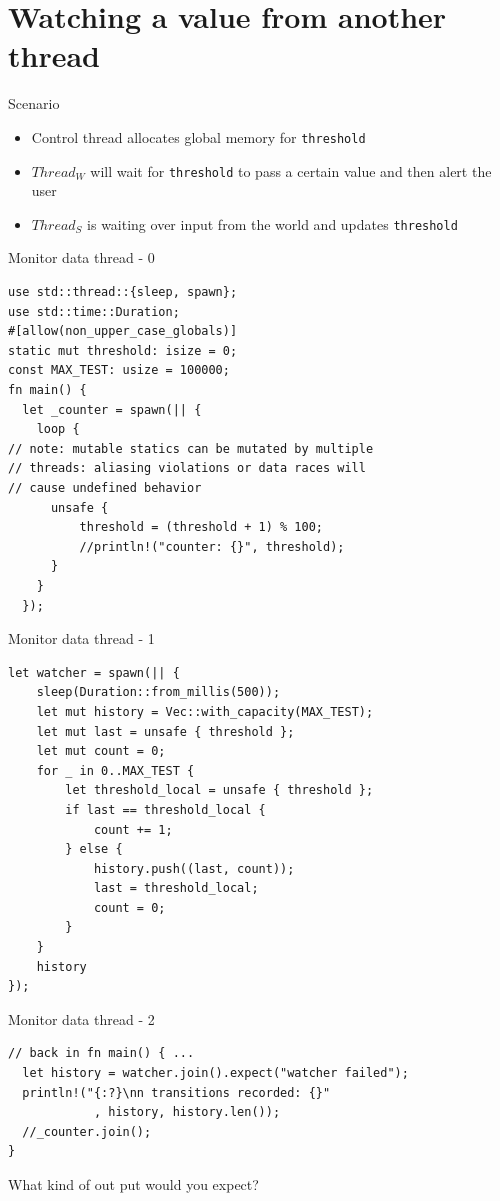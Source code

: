 \documentclass[10pt]{beamer}
\begin{document}
\section{Watching a value from another thread}

\begin{frame}{Scenario}
    \begin{itemize}
        \item Control thread allocates global memory for \texttt{threshold}
        \item $Thread_W$ will wait for \texttt{threshold} to pass a certain value and then alert the user
        \item $Thread_S$ is waiting over input from the world and updates \texttt{threshold}
    \end{itemize}
\end{frame}

\begin{frame}[fragile]{Monitor data thread - 0}
\begin{verbatim}
use std::thread::{sleep, spawn};
use std::time::Duration;
#[allow(non_upper_case_globals)]
static mut threshold: isize = 0;
const MAX_TEST: usize = 100000;
fn main() {
  let _counter = spawn(|| {
    loop {
// note: mutable statics can be mutated by multiple 
// threads: aliasing violations or data races will 
// cause undefined behavior
      unsafe {
          threshold = (threshold + 1) % 100;
          //println!("counter: {}", threshold);
      }
    }
  });
\end{verbatim}
\end{frame}

\begin{frame}[fragile]{Monitor data thread - 1}
\begin{verbatim}
let watcher = spawn(|| {
    sleep(Duration::from_millis(500));
    let mut history = Vec::with_capacity(MAX_TEST);
    let mut last = unsafe { threshold };
    let mut count = 0;
    for _ in 0..MAX_TEST {
        let threshold_local = unsafe { threshold };
        if last == threshold_local {
            count += 1;
        } else {
            history.push((last, count));
            last = threshold_local;
            count = 0;
        }
    }
    history
});

\end{verbatim}
\end{frame}

\begin{frame}[fragile]{Monitor data thread - 2}
\begin{verbatim}
// back in fn main() { ...
  let history = watcher.join().expect("watcher failed");
  println!("{:?}\nn transitions recorded: {}"
            , history, history.len());
  //_counter.join();
}

\end{verbatim}
What kind of out put would you \alert{expect}?

\end{frame}
\end{document}
